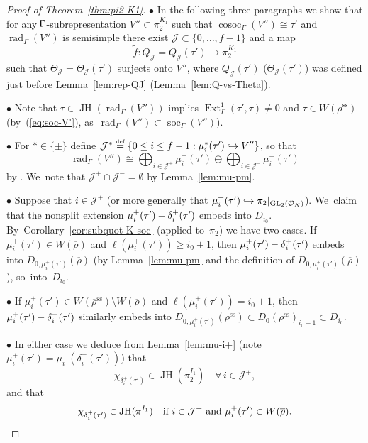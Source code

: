 \documentclass[JEP,XML,SOM,Unicode,NoFloatCountersInSection, NoEqCountersInSection,published]{cedram}
\newcommand\hto{\mathrel{\lhook\joinrel\to}}
\newcommand{\sbullet}{{\scriptscriptstyle\bullet}}
\let\wt\widetilde
\newcommand{\defeq}{\stackrel{\textrm{\tiny{\upshape{def}}}}{=}}
\newcommand{\cJ}{{\mathcal{J}}}
\newcommand{\cO}{\mathcal{O}}
\renewcommand{\ss}{\mathrm{ss}}
\newcommand{\brho}{\overline{\rho}}
\DeclareMathOperator{\cosoc}{cosoc}
\DeclareMathOperator{\Ext}{Ext}
\DeclareMathOperator{\GL}{GL}
\DeclareMathOperator{\JH}{\mathrm{JH}}
\DeclareMathOperator{\rad}{rad}
\DeclareMathOperator{\soc}{soc}
\theoremstyle{plain}
\theoremstyle{definition}
\begin{document}
\begin{proof}[Proof of Theorem~\ref{thm:pi2-K1}]
$\sbullet$ In the following three paragraphs we show that for any $\mkern-2mu\Gamma$-subrepresentation \hbox{$V'' \subset\pi_2^{K_1}$} such that $\cosoc_\Gamma(V'') \cong \tau'$ and $\rad_\Gamma(V'')$ is semisimple there exist $\cJ\subset \{0,\dots,f-1\}$ and a map
\[
\wt f: Q_\cJ=Q_\cJ(\tau') \to \pi_2^{K_1}
\]
such that $\Theta_\cJ=\Theta_\cJ(\tau')$ surjects onto $V''$, where $Q_\cJ(\tau')$ (\resp $\Theta_\cJ(\tau')$) was defined just before Lemma~\ref{lem:rep-QJ} (\resp Lemma~\ref{lem:Q-vs-Theta}).

$\sbullet$ Note that $\tau \in \JH(\rad_\Gamma(V''))$ implies $\Ext_\Gamma^1(\tau',\tau) \ne 0$ and $\tau \in W(\brho^\ss)$ (by~(\ref{eq:soc-V'}), as~$\rad_\Gamma(V'') \subset \soc_\Gamma(V'')$).

$\sbullet$ For $* \in \{\pm\}$ define $\cJ^* \defeq \{ 0 \le i \le f-1: \mu_i^*(\tau') \hto V'' \}$, so that
\[
\rad_\Gamma(V'') \cong \bigoplus_{i \in \cJ^+} \mu_i^+(\tau') \oplus \bigoplus_{i \in \cJ^-} \mu_i^-(\tau')
\]
by \cite[Lem.\,4.3.4]{BHHMS4}. We~note that $\cJ^+ \cap \cJ^- = \emptyset$ by
Lemma~\ref{lem:mu-pm}.

$\sbullet$ Suppose that $i \in \cJ^+$ (or more generally that $\mu_i^+(\tau') \hto \pi_2|_{\GL_2(\cO_K)}$). We~claim that the nonsplit extension $\mu_i^+(\tau') \-- \delta_i^+(\tau')$ embeds into $D_{i_0}$. By~Corollary~\ref{cor:subquot-K-soc} (applied to~$\pi_2$) we have two cases.
If $\mu_i^+(\tau') \in W(\brho)$ and $\ell(\mu_i^+(\tau')) \ge i_0+1$, then $\mu_i^+(\tau') -\nobreak \delta_i^+(\tau')$ embeds into $D_{0,\mu_i^+(\tau')}(\brho)$ (by Lemma~\ref{lem:mu-pm} and the definition of $D_{0,\mu_i^+(\tau')}(\brho)$), so~into~$D_{i_0}$.

$\sbullet$ If $\mu_i^+(\tau') \in W(\brho^\ss)\setminus W(\brho)$ and $\ell(\mu_i^+(\tau')) = i_0+1$, then $\mu_i^+(\tau') \-- \delta_i^+(\tau')$ similarly embeds into $D_{0,\mu_i^+(\tau')}(\brho^\ss) \subset D_0(\brho^\ss)_{i_0+1} \subset D_{i_0}$.

$\sbullet$ In either case we deduce from Lemma~\ref{lem:mu-i+} (note $\mu_i^+(\tau') = \mu_i^-(\delta_i^+(\tau'))$) that
\begin{equation}\label{eq:chi-delta-tau-pi2}
\chi_{\delta_i^+(\tau')} \in \JH(\pi_2^{I_1}) \quad\forall\,i \in \cJ^+,
\end{equation}
and that
\begin{equation}\label{eq:chi-delta-tau-pi}
\chi_{\delta_i^+(\tau')} \in \JH(\pi^{I_1}) \text{\quad if $i \in \cJ^+$ and $\mu_i^+(\tau') \in W(\brho)$}.
\end{equation}


\end{proof}
\end{document}
